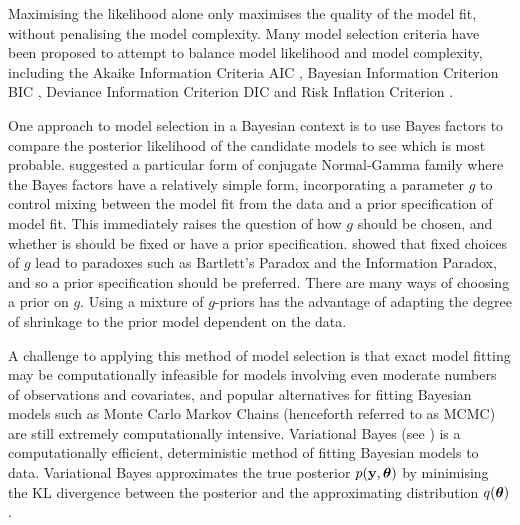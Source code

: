 \documentclass{amsart}[12pt]
\begin{document}

Maximising the likelihood alone only maximises the quality of the model fit, without penalising the  model
complexity. Many model selection criteria have been proposed to attempt to balance model likelihood and model
complexity, including the Akaike Information Criteria AIC \cite{DeLeeuw1992}, Bayesian Information Criterion
BIC \cite{Schwarz1978}, Deviance Information Criterion DIC \cite{Spiegelhalter2016} and Risk Inflation
Criterion \cite{Foster1994}.


One approach to model selection in a Bayesian context is to use Bayes factors to compare the posterior
likelihood of the candidate models to see which is most probable. \cite{Zellner1980} suggested a particular form
of conjugate Normal-Gamma family where the Bayes factors have a relatively simple form, incorporating a
parameter $g$ to control mixing between the model fit from the data and a prior specification of model fit.
This immediately raises the question of how $g$ should be chosen, and whether is should be fixed or have a
prior specification.  \cite{Liang2008} showed that fixed choices of $g$ lead to paradoxes such as Bartlett's
Paradox and the Information Paradox, and so a prior specification should be preferred. There are many ways of
choosing a prior on $g$. Using a mixture of $g$-priors has the advantage of adapting the degree of shrinkage
to the prior model dependent on the data.



A challenge to applying this method of model selection is that exact model fitting may be computationally
infeasible for models involving even moderate numbers of observations and covariates, and popular alternatives
for fitting Bayesian models such as Monte Carlo Markov Chains (henceforth referred to as MCMC) are still
extremely computationally intensive. Variational Bayes (see \cite{Ormerod2010}) is a computationally
efficient, deterministic method of fitting Bayesian models to data. Variational Bayes approximates the true
posterior $p({\bf y}, {\boldsymbol \theta})$ by minimising the KL divergence between the posterior and the  approximating
distribution $q({\boldsymbol \theta})$.



\end{document}
